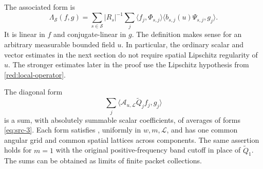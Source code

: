 The associated form is
\begin{equation}\label{eq:src-3}
 \Lambda_{\mathcal S}(f,g)
   =\sum_{s\in\mathcal S}|R_s|^{-1}\sum_j
       \langle f_j,\Phi_{s,j}\rangle
       \langle b_{s,j}(u)\Psi_{s,j},g_j\rangle.
\end{equation}
It is linear in \(f\) and conjugate-linear in \(g\). The definition
makes sense for an arbitrary measurable bounded field \(u\). In
particular, the ordinary scalar and vector estimates in the next
section do not require spatial Lipschitz regularity of \(u\).
The stronger estimates later in the proof use the Lipschitz
hypothesis from \eqref{red:local-operator}.

\begin{proposition}\label{red:packet-representation}
The diagonal form
\[
 \sum_j\langle\mathcal A_{u,\mathcal L}
                         \widetilde Q_j f_j,g_j\rangle
\]
is a sum, with absolutely summable scalar coefficients, of averages
of forms \eqref{eq:src-3}. Each form satisfies
, uniformly in \(w,m,\mathcal L\), and has one
common angular grid and common spatial lattices across components.
The same assertion holds for \(m=1\) with the original
positive-frequency band cutoff in place of \(\widetilde Q_1\).
The sums can be obtained as limits of finite packet collections.
\end{proposition}

